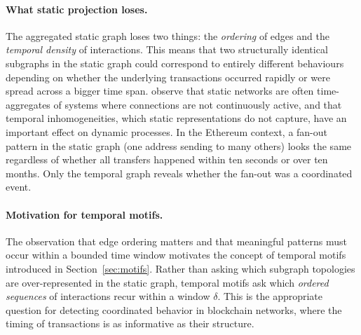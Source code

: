 \paragraph{What static projection loses.}
The aggregated static graph loses two things: the \emph{ordering} of edges and the \emph{temporal density} of interactions. This means that two structurally identical subgraphs in the static graph could correspond to entirely different behaviours depending on whether the underlying transactions occurred rapidly or were spread across a bigger time span. \citet{kovanen2011temporal} observe that static networks are often time-aggregates of systems where connections are not continuously active, and that temporal inhomogeneities, which static representations do not capture, have an important effect on dynamic processes. In the Ethereum context, a fan-out pattern in the static graph (one address sending to many others) looks the same regardless of whether all transfers happened within ten seconds or over ten months. Only the temporal graph reveals whether the fan-out was a coordinated event.

\paragraph{Motivation for temporal motifs.}
The observation that edge ordering matters and that meaningful patterns must occur within a bounded time window motivates the concept of temporal motifs introduced in Section~\ref{sec:motifs}. Rather than asking which subgraph topologies are over-represented in the static graph, temporal motifs ask which \emph{ordered sequences} of interactions recur within a window $\delta$. This is the appropriate question for detecting coordinated behavior in blockchain networks, where the timing of transactions is as informative as their structure.
